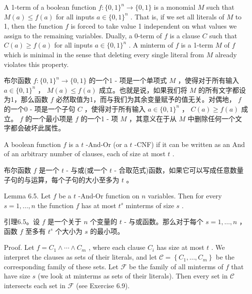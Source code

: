 \documentclass[10pt]{article}
\begin{document}
A 1-term of a boolean function \(f : \{ 0,1{\} }^{n} \rightarrow  \{ 0,1\}\) is a monomial \(M\) such that \(M\left( a\right)  \leq  f\left( a\right)\) for all inputs \(a \in  \{ 0,1{\} }^{n}\) . That is, if we set all literals of \(M\) to 1, then the function \(f\) is forced to take value 1 independent on what values we assign to the remaining variables. Dually, a 0-term of \(f\) is a clause \(C\) such that \(C\left( a\right)  \geq  f\left( a\right)\) for all inputs \(a \in  \{ 0,1{\} }^{n}\) . A minterm of \(f\) is a 1-term \(M\) of \(f\) which is minimal in the sense that deleting every single literal from \(M\) already violates this property.

\begin{tcolorbox}\relax
布尔函数 \(f : \{ 0,1{\} }^{n} \rightarrow  \{ 0,1\}\) 的一个1 - 项是一个单项式 \(M\) ，使得对于所有输入 \(a \in  \{ 0,1{\} }^{n}\) ， \(M\left( a\right)  \leq  f\left( a\right)\) 成立。也就是说，如果我们将 \(M\) 的所有文字都设为1，那么函数 \(f\) 必然取值为1，而与我们为其余变量赋予的值无关。对偶地， \(f\) 的一个0 - 项是一个子句 \(C\) ，使得对于所有输入 \(a \in  \{ 0,1{\} }^{n}\) ， \(C\left( a\right)  \geq  f\left( a\right)\) 成立。 \(f\) 的一个最小项是 \(f\) 的一个1 - 项 \(M\) ，其意义在于从 \(M\) 中删除任何一个文字都会破坏此属性。
\end{tcolorbox}

A boolean function \(f\) is a \(t\) -And-Or (or a \(t\) -CNF) if it can be written as an And of an arbitrary number of clauses, each of size at most \(t\) .

\begin{tcolorbox}\relax
布尔函数 \(f\) 是一个 \(t\) - 与或(或一个 \(t\) - 合取范式)函数，如果它可以写成任意数量子句的与运算，每个子句的大小至多为 \(t\) 。
\end{tcolorbox}

Lemma 6.5. Let \(f\) be a \(t\) -And-Or function on \(n\) variables. Then for every \(s = 1,\ldots ,n\) the function \(f\) has at most \({t}^{s}\) minterms of size \(s\) .

\begin{tcolorbox}\relax
引理6.5。设 \(f\) 是一个关于 \(n\) 个变量的 \(t\) - 与或函数。那么对于每个 \(s = 1,\ldots ,n\) ，函数 \(f\) 至多有 \({t}^{s}\) 个大小为 \(s\) 的最小项。
\end{tcolorbox}

Proof. Let \(f = {C}_{1} \land  \cdots  \land  {C}_{m}\) , where each clause \({C}_{i}\) has size at most \(t\) . We interpret the clauses as sets of their literals, and let \(\mathcal{C} = \left\{  {{C}_{1},\ldots ,{C}_{m}}\right\}\) be the corresponding family of these sets. Let \(\mathcal{F}\) be the family of all minterms of \(f\) that have size \(s\) (we look at minterms as sets of their literals). Then every set in \(\mathcal{C}\) intersects each set in \(\mathcal{F}\) (see Exercise 6.9).
\end{document}
